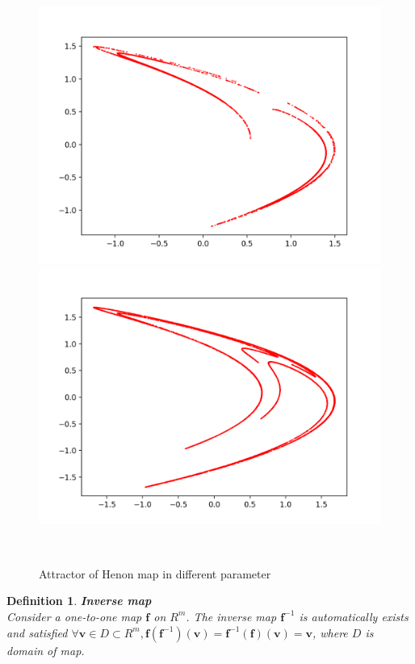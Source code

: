 \documentclass[12pt]{article}
\theoremstyle{plain}
\newtheorem{definition}{{\color{red}\textbf{Definition}}}[section]
\begin{document}
\begin{figure}[H]
\begin{minipage}[c][0.32\width]{0.32\textwidth}
   \includegraphics[width=\textwidth]{figure/section2/Henon-attractor-1*045-0*4.png}
\end{minipage}
\begin{minipage}[c][0.32\width]{0.32\textwidth}
   \centering
   \includegraphics[width=\textwidth]{figure/section2/Henon-attractor-1*2-0*4.png}
\end{minipage}
\\[4ex]\caption{Attractor of Henon map in different parameter}\label{attractor-Henon-map}
\end{figure}


\begin{definition}\textbf{Inverse map}
\\\noindent Consider a one-to-one map $\mathbf f$ on $R^m$. The inverse map $\mathbf f^{-1}$ is automatically exists and satisfied $\forall \mathbf v \in D \subset R^m, \mathbf f(\mathbf f^{-1})(\mathbf v) = \mathbf f^{-1}(\mathbf f)(\mathbf v) = \mathbf v$, where $D$ is domain of map.
\end{definition}
\end{document}
